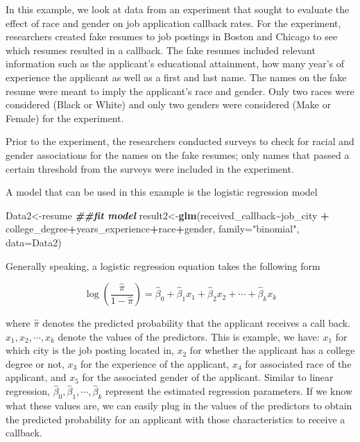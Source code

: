 \documentclass[
]{book}
\newenvironment{Shaded}{\begin{snugshade}}{\end{snugshade}}
\newcommand{\AttributeTok}[1]{\textcolor[rgb]{0.13,0.29,0.53}{#1}}
\newcommand{\DocumentationTok}[1]{\textcolor[rgb]{0.56,0.35,0.01}{\textbf{\textit{#1}}}}
\newcommand{\FunctionTok}[1]{\textcolor[rgb]{0.13,0.29,0.53}{\textbf{#1}}}
\newcommand{\NormalTok}[1]{#1}
\newcommand{\OtherTok}[1]{\textcolor[rgb]{0.56,0.35,0.01}{#1}}
\newcommand{\SpecialCharTok}[1]{\textcolor[rgb]{0.81,0.36,0.00}{\textbf{#1}}}
\newcommand{\StringTok}[1]{\textcolor[rgb]{0.31,0.60,0.02}{#1}}
\begin{document}
In this example, we look at data from an experiment that sought to evaluate the effect of race and gender on job application callback rates. For the experiment, researchers created fake resumes to job postings in Boston and Chicago to see which resumes resulted in a callback. The fake resumes included relevant information such as the applicant's educational attainment, how many year's of experience the applicant as well as a first and last name. The names on the fake resume were meant to imply the applicant's race and gender. Only two races were considered (Black or White) and only two genders were considered (Make or Female) for the experiment.

Prior to the experiment, the researchers conducted surveys to check for racial and gender associations for the names on the fake resumes; only names that passed a certain threshold from the surveys were included in the experiment.

A model that can be used in this example is the logistic regression model

\begin{Shaded}
\begin{Highlighting}[]
\NormalTok{Data2}\OtherTok{\textless{}{-}}\NormalTok{resume}
\DocumentationTok{\#\#fit model}
\NormalTok{result2}\OtherTok{\textless{}{-}}\FunctionTok{glm}\NormalTok{(received\_callback}\SpecialCharTok{\textasciitilde{}}\NormalTok{job\_city }\SpecialCharTok{+}\NormalTok{ college\_degree}\SpecialCharTok{+}\NormalTok{years\_experience}\SpecialCharTok{+}\NormalTok{race}\SpecialCharTok{+}\NormalTok{gender, }\AttributeTok{family=}\StringTok{"binomial"}\NormalTok{, }\AttributeTok{data=}\NormalTok{Data2)}
\end{Highlighting}
\end{Shaded}

Generally speaking, a logistic regression equation takes the following form

\[
\log (\frac{\hat{\pi}}{1-\hat{\pi}}) = \hat{\beta}_0 + \hat{\beta}_1 x_1 + \hat{\beta}_2 x_2 + \cdots + \hat{\beta}_k x_k
\]

where \(\hat{\pi}\) denotes the predicted probability that the applicant receives a call back. \(x_1, x_2, \cdots, x_k\) denote the values of the predictors. This is example, we have: \(x_1\) for which city is the job posting located in, \(x_2\) for whether the applicant has a college degree or not, \(x_3\) for the experience of the applicant, \(x_4\) for associated race of the applicant, and \(x_5\) for the associated gender of the applicant. Similar to linear regression, \(\hat{\beta}_0, \hat{\beta}_1, \cdots, \hat{\beta}_k\) represent the estimated regression parameters. If we know what these values are, we can easily plug in the values of the predictors to obtain the predicted probability for an applicant with those characteristics to receive a callback.
\end{document}
